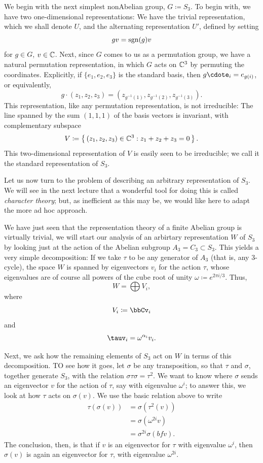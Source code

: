 We begin with the next simplest nonAbelian group, $G\coloneqq S_3$. To
begin with, we have two one-dimensional representations: We have the
trivial representation, which we shall denote $U$, and the alternating
representation $U'$, defined by setting
\[
gv=\operatorname{sgn}(g)v
\]
for $g\in G$, $v\in\mathbb{C}$. Next, since $G$ comes to us as a permutation
group, we have a natural permutation representation, in which $G$ acts on
$\mathbb{C}^3$ by permuting the coordinates. Explicitly, if
$\{e_1,e_2,e_3\}$ is the standard basis, then
$g\cdote_i=e_{g(i)}$, or equivalently,
\[
g\cdot (z_1,z_2,z_3)=\left(z_{g^{-1}(1)},z_{g^{-1}(2)},z_{g^{-1}(3)}\right).
\]
This representation, like any permutation representation, is not
irreducible: The line spanned by the sum $(1,1,1)$ of the basis vectors is
invariant, with complementary subspace
\[
V\coloneqq\left\{\,(z_1,z_2,z_3)\in\mathbb{C}^3:z_1+z_2+z_3=0\,\right\}.
\]
This two-dimensional representation of $V$ is easily seen to be
irreducible; we call it the standard representation of $S_3$.

Let us now turn to the problem of describing an arbitrary representation of
$S_3$. We will see in the next lecture that a wonderful tool for doing this
is called \emph{character theory}; but, as inefficient as this may be, we
would like here to adapt the more ad hoc approach.

We have just seen that the representation theory of a finite Abelian group
is virtually trivial, we will start our analysis of an arbirtary
representation $W$ of $S_3$ by looking just at the action of the Abelian
subgroup $A_3=C_3\subset S_3$. This yields a very simple decomposition: If
we take $\tau$ to be any generator of $A_3$ (that is, any $3$-cycle), the
space $W$ is spanned by eigenvectors $v_i$ for the action $\tau$, whose
eigenvalues are of course all powers of the cube root of unity
$\omega\coloneqq e^{2\pi i/3}$. Thus,
\[
W=\bigoplus V_i,
\]
where
\[
V_i\coloneqq\bbCv_i
\]
and
\[
\tauv_i=\omega^{\alpha_i}v_i.
\]

Next, we ask how the remaining elements of $S_3$ act on $W$ in terms of
this decomposition. TO see how it goes, let $\sigma$ be any transposition,
so that $\tau$ and $\sigma$, together generate $S_3$, with the relation
$\sigma\tau\sigma=\tau^2$. We want to know where $\sigma$ sends an
eigenvector $v$ for the action of $\tau$, say with eigenvalue
$\omega^i$; to answer this, we look at how $\tau$ acts on
$\sigma(v)$. We use the basic relation above to write
\[
  \begin{aligned}
    \tau(\sigma(v))
    &=\sigma(\tau^2(v))\\
    &=\sigma(\omega^{2i}v)\\
    &=\sigma^{2i}\sigma(bfv).
  \end{aligned}
\]
The conclusion, then, is that if $v$ is an eigenvector for $\tau$ with
eigenvalue $\omega^i$, then $\sigma(v)$ is again an eigenvector for
$\tau$, with eigenvalue $\omega^{2i}$.


